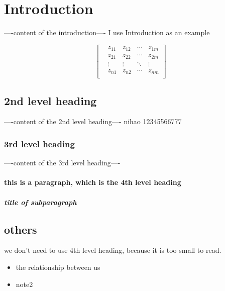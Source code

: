 \newpage
\section{Introduction}
----content of the introduction----
I use Introduction as an example

\partLine
\[
\begin{bmatrix}
    &z_{11}  &z_{12}  &\cdots   &z_{1m} \\
    &z_{21}  &z_{22}  &\cdots   &z_{2m} \\
    &\vdots   & \vdots  & \ddots & \vdots  \\
    &z_{n1}  &z_{n2}  &\cdots   &z_{nm} \\
\end{bmatrix}
\]
\partLine




\partLine

\subsection{2nd level heading}
----content of the 2nd level heading----
nihao 12345566777
\subsubsection{3rd level heading}
----content of the 3rd level heading----
\paragraph{this is a paragraph, which is the 4th level heading}
\subparagraph{title of subparagraph}

\subsection{others}
we don't need to use 4th level heading, because it is too small to read. 

\begin{itemize}
    \item the relationship between us
    \item note2
\end{itemize}


